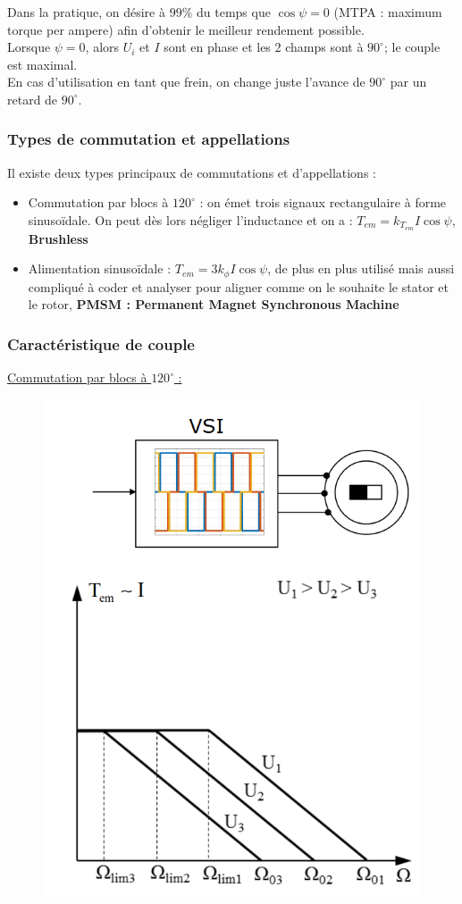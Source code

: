\documentclass[../main.tex]{subfiles}
\begin{document}
\warning Dans la pratique, on désire à $99\%$ du temps que $\cos \psi = 0$ (MTPA : maximum torque per ampere) afin d'obtenir le meilleur rendement possible.\\

Lorsque $\psi = 0$, alors $U_i$ et $I$ sont en phase et les 2 champs sont à $90^\circ$; le couple est maximal.\\

En cas d'utilisation en tant que frein, on change juste l'avance de $90^\circ$ par un retard de $90^\circ$.\\

\subsubsection{Types de commutation et appellations}
Il existe deux types principaux de commutations et d'appellations : \begin{itemize}
    \item Commutation par blocs à $120^\circ$ : on émet trois signaux rectangulaire à forme sinusoïdale. On peut dès lors négliger l'inductance et on a : $T_{em} = k_{T_{em}} I \cos\psi$, \textbf{Brushless}\\
    \item Alimentation sinusoïdale : $T_{em} = 3k_\phi I \cos\psi$, de plus en plus utilisé mais aussi compliqué à coder et analyser pour aligner comme on le souhaite le stator et le rotor, \textbf{PMSM : Permanent Magnet Synchronous Machine}\\
\end{itemize}

\subsubsection{Caractéristique de couple}

\quad \underline{Commutation par blocs à $120^\circ$ :}\\

\begin{figure}[hbt!]
    \centering
    \includegraphics[width=.4\textwidth]{IMAGES/machineelec/Screenshot from 2023-11-25 00-38-51.png}
\end{figure}
\end{document}
